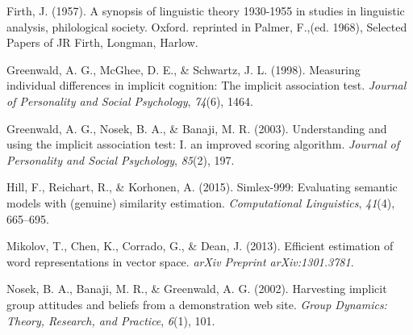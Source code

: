 \documentclass[10pt, letterpaper]{article}
\begin{document}
\hypertarget{ref-firth1957synopsis}{}
Firth, J. (1957). A synopsis of linguistic theory 1930-1955 in studies
in linguistic analysis, philological society. Oxford. reprinted in
Palmer, F.,(ed. 1968), Selected Papers of JR Firth, Longman, Harlow.

\hypertarget{ref-greenwald1998measuring}{}
Greenwald, A. G., McGhee, D. E., \& Schwartz, J. L. (1998). Measuring
individual differences in implicit cognition: The implicit association
test. \emph{Journal of Personality and Social Psychology}, \emph{74}(6),
1464.

\hypertarget{ref-greenwald2003understanding}{}
Greenwald, A. G., Nosek, B. A., \& Banaji, M. R. (2003). Understanding
and using the implicit association test: I. an improved scoring
algorithm. \emph{Journal of Personality and Social Psychology},
\emph{85}(2), 197.

\hypertarget{ref-hill2015simlex}{}
Hill, F., Reichart, R., \& Korhonen, A. (2015). Simlex-999: Evaluating
semantic models with (genuine) similarity estimation.
\emph{Computational Linguistics}, \emph{41}(4), 665--695.

\hypertarget{ref-mikolov2013efficient}{}
Mikolov, T., Chen, K., Corrado, G., \& Dean, J. (2013). Efficient
estimation of word representations in vector space. \emph{arXiv Preprint
arXiv:1301.3781}.

\hypertarget{ref-nosek2002harvesting}{}
Nosek, B. A., Banaji, M. R., \& Greenwald, A. G. (2002). Harvesting
implicit group attitudes and beliefs from a demonstration web site.
\emph{Group Dynamics: Theory, Research, and Practice}, \emph{6}(1), 101.
\end{document}
